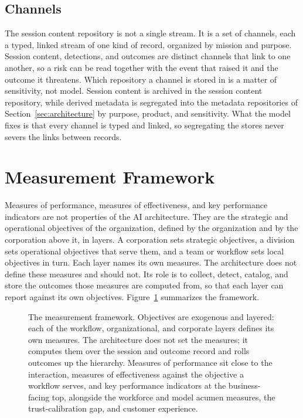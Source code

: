 \documentclass[11pt]{article}
\begin{document}
\subsection{Channels}

The session content repository is not a single stream. It is a set of channels,
each a typed, linked stream of one kind of record, organized by mission and
purpose. Session content, detections, and outcomes are distinct channels that link
to one another, so a risk can be read together with the event that raised it and
the outcome it threatens. Which repository a channel is stored in is a matter of
sensitivity, not model. Session content is archived in the session content
repository, while derived metadata is segregated into the metadata repositories of
Section~\ref{sec:architecture} by purpose, product, and sensitivity. What the
model fixes is that every channel is typed and linked, so segregating the stores
never severs the links between records.

\section{Measurement Framework}
\label{sec:measurement}

Measures of performance, measures of effectiveness, and key performance
indicators are not properties of the AI architecture. They are the strategic and
operational objectives of the organization, defined by the organization and by
the corporation above it, in layers. A corporation sets strategic objectives, a
division sets operational objectives that serve them, and a team or workflow sets
local objectives in turn. Each layer names its own measures. The architecture
does not define these measures and should not. Its role is to collect, detect,
catalog, and store the outcomes those measures are computed from, so that each
layer can report against its own objectives. Figure~\ref{fig:measurement}
summarizes the framework.

\begin{figure}[t]
\centering
\resizebox{\textwidth}{!}{}
\caption{The measurement framework. Objectives are exogenous and layered: each of
the workflow, organizational, and corporate layers defines its own measures. The
architecture does not set the measures; it computes them over the session and
outcome record and rolls outcomes up the hierarchy. Measures of performance sit
close to the interaction, measures of effectiveness against the objective a
workflow serves, and key performance indicators at the business-facing top,
alongside the workforce and model acumen measures, the trust-calibration gap, and
customer experience.}
\label{fig:measurement}
\end{figure}
\end{document}
